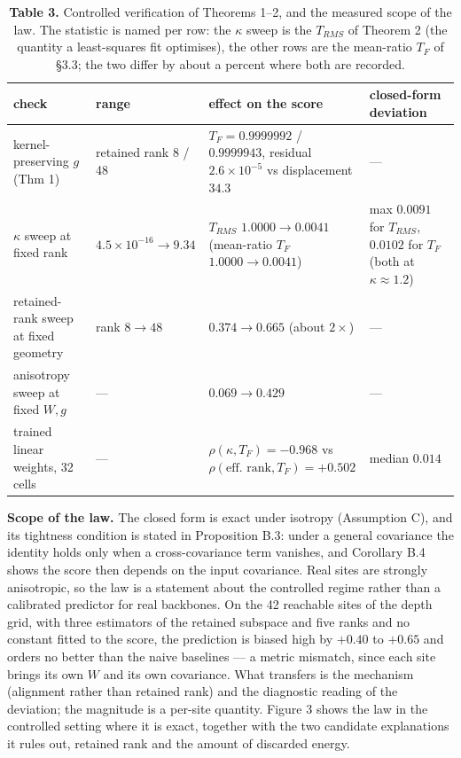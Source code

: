 \begin{table}[t]
\centering
\small
\caption*{\textbf{Table 3.} Controlled verification of Theorems 1--2, and the measured scope of the law. The statistic is named per row: the $\kappa$ sweep is the $T_{RMS}$ of Theorem 2 (the quantity a least-squares fit optimises), the other rows are the mean-ratio $T_F$ of \S{}3.3; the two differ by about a percent where both are recorded.}
\begin{tabularx}{\textwidth}{@{}>{\raggedright\arraybackslash}X >{\raggedright\arraybackslash}X >{\raggedright\arraybackslash}X >{\raggedright\arraybackslash}X@{}}
\toprule
\textbf{check} & \textbf{range} & \textbf{effect on the score} & \textbf{closed-form deviation} \\
\midrule
kernel-preserving $g$ (Thm 1) & retained rank 8 / 48 & $T_F = 0.9999992$ / $0.9999943$, residual $2.6\times10^{-5}$ vs displacement $34.3$ & --- \\
$\kappa$ sweep at fixed rank & $4.5\times10^{-16}\to 9.34$ & $T_{RMS}$ $1.0000\to 0.0041$ (mean-ratio $T_F$ $1.0000\to 0.0041$) & max $0.0091$ for $T_{RMS}$, $0.0102$ for $T_F$ (both at $\kappa\approx1.2$) \\
retained-rank sweep at fixed geometry & rank $8\to48$ & $0.374\to0.665$ (about $2\times$) & --- \\
anisotropy sweep at fixed $W,\allowbreak{}g$ & --- & $0.069\to0.429$ & --- \\
trained linear weights, 32 cells & --- & $\rho(\kappa,\allowbreak{}T_F)=-0.968$ vs $\rho(\text{eff. rank},\allowbreak{}T_F)=+0.502$ & median $0.014$ \\
\bottomrule
\end{tabularx}
\end{table}

\textbf{Scope of the law.} The closed form is exact under isotropy (Assumption C), and its tightness condition is stated in Proposition B.3: under a general covariance the identity holds only when a cross-covariance term vanishes, and Corollary B.4 shows the score then depends on the input covariance. Real sites are strongly anisotropic, so the law is a statement about the controlled regime rather than a calibrated predictor for real backbones. On the 42 reachable sites of the depth grid, with three estimators of the retained subspace and five ranks and no constant fitted to the score, the prediction is biased high by $+0.40$ to $+0.65$ and orders no better than the naive baselines --- a metric mismatch, since each site brings its own $W$ and its own covariance. What transfers is the mechanism (alignment rather than retained rank) and the diagnostic reading of the deviation; the magnitude is a per-site quantity. Figure 3 shows the law in the controlled setting where it is exact, together with the two candidate explanations it rules out, retained rank and the amount of discarded energy.

